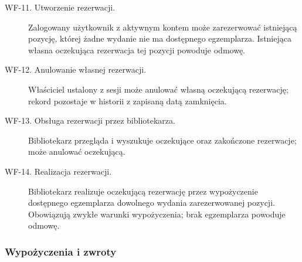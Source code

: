 \documentclass[11pt, a4paper]{article}
\begin{document}
\begin{description}
\item[WF-11. Utworzenie rezerwacji.] Zalogowany użytkownik z aktywnym kontem może zarezerwować istniejącą pozycję, której żadne wydanie nie ma dostępnego egzemplarza. Istniejąca własna oczekująca rezerwacja tej pozycji powoduje odmowę.
\item[WF-12. Anulowanie własnej rezerwacji.] Właściciel ustalony z sesji może anulować własną oczekującą rezerwację; rekord pozostaje w historii z zapisaną datą zamknięcia.
\item[WF-13. Obsługa rezerwacji przez bibliotekarza.] Bibliotekarz przegląda i wyszukuje oczekujące oraz zakończone rezerwacje; może anulować oczekującą.
\item[WF-14. Realizacja rezerwacji.] Bibliotekarz realizuje oczekującą rezerwację przez wypożyczenie dostępnego egzemplarza dowolnego wydania zarezerwowanej pozycji. Obowiązują zwykłe warunki wypożyczenia; brak egzemplarza powoduje odmowę.
\end{description}

\subsubsection{Wypożyczenia i zwroty}
\end{document}
